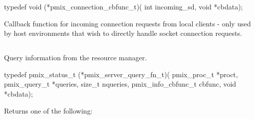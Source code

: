 \format

\cspecificstart
\begin{codepar}
typedef void (*pmix_connection_cbfunc_t)(
                    int incoming_sd, void *cbdata);
\end{codepar}
\cspecificend

\begin{arglist}
\end{arglist}

\descr

Callback function for incoming connection requests from local clients - only used by host environments that wish to directly handle socket connection requests.


\subsection{}

\summary

Query information from the resource manager.

\format

\cspecificstart
\begin{codepar}
typedef pmix_status_t (*pmix_server_query_fn_t)(
                             pmix_proc_t *proct,
                             pmix_query_t *queries,
                             size_t nqueries,
                             pmix_info_cbfunc_t cbfunc,
                             void *cbdata);
\end{codepar}
\cspecificend

\begin{arglist}
\end{arglist}

Returns one of the following:

